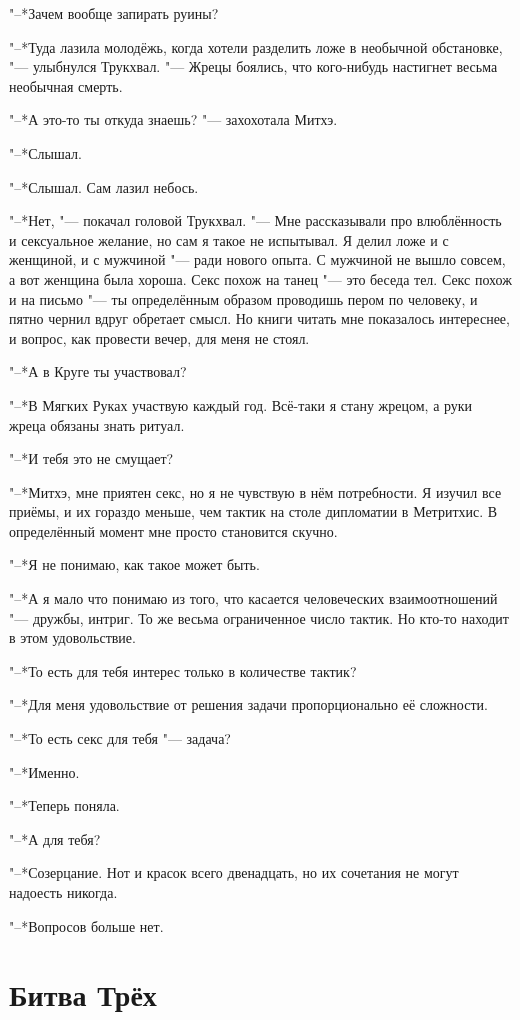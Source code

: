 \documentclass[a4paper,10pt,fleqn]{book}
\begin{document}
"--*Зачем вообще запирать руины?

"--*Туда лазила молодёжь, когда хотели разделить ложе в необычной обстановке, "--- улыбнулся Трукхвал.
"--- Жрецы боялись, что кого-нибудь настигнет весьма необычная смерть.

"--*А это-то ты откуда знаешь? "--- захохотала Митхэ.

"--*Слышал.

"--*Слышал.
Сам лазил небось.

"--*Нет, "--- покачал головой Трукхвал.
"--- Мне рассказывали про влюблённость и сексуальное желание, но сам я такое не испытывал.
Я делил ложе и с женщиной, и с мужчиной "--- ради нового опыта.
С мужчиной не вышло совсем, а вот женщина была хороша.
Секс похож на танец "--- это беседа тел.
Секс похож и на письмо "--- ты определённым образом проводишь пером по человеку, и пятно чернил вдруг обретает смысл.
Но книги читать мне показалось интереснее, и вопрос, как провести вечер, для меня не стоял.

"--*А в Круге ты участвовал?

"--*В Мягких Руках участвую каждый год.
Всё-таки я стану жрецом, а руки жреца обязаны знать ритуал.

"--*И тебя это не смущает?

"--*Митхэ, мне приятен секс, но я не чувствую в нём потребности.
Я изучил все приёмы, и их гораздо меньше, чем тактик на столе дипломатии в Метритхис.
В определённый момент мне просто становится скучно.

"--*Я не понимаю, как такое может быть.

"--*А я мало что понимаю из того, что касается человеческих взаимоотношений "--- дружбы, интриг.
То же весьма ограниченное число тактик.
Но кто-то находит в этом удовольствие.

"--*То есть для тебя интерес только в количестве тактик?

"--*Для меня удовольствие от решения задачи пропорционально её сложности.

"--*То есть секс для тебя "--- задача?

"--*Именно.

"--*Теперь поняла.

"--*А для тебя?

"--*Созерцание.
Нот и красок всего двенадцать, но их сочетания не могут надоесть никогда.

"--*Вопросов больше нет.

\section{Битва Трёх}
\end{document}
